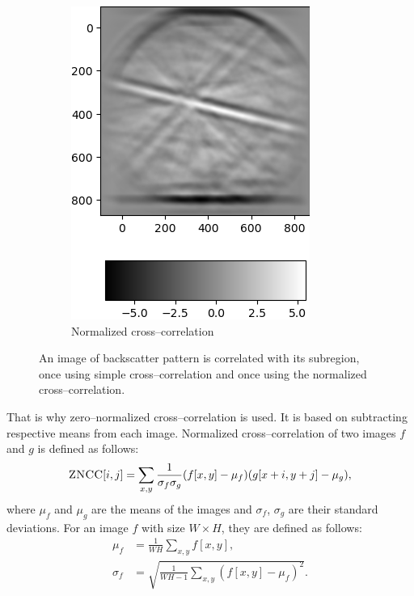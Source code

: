 \begin{figure}
\begin{subfigure}{.49\textwidth}
		\includegraphics[width=\linewidth]{img/normalized_corr}
		\caption{Normalized cross--correlation}
		\label{normalized-cross}
	\end{subfigure}
	
	\caption{An image of backscatter pattern is correlated with its subregion, once using simple cross--correlation and once using the normalized cross--correlation.}
\end{figure}

That is why zero--normalized cross--correlation is used. It is based on subtracting respective means from each image. Normalized cross--correlation of two images $f$ and $g$ is defined as follows:
\[
\textsc{ZNCC}[i,j] = \sum_{x, y} \frac{1}{\sigma_f \sigma_g}(f[x,y] - \mu_f)(g[x+i,y+j] - \mu_g),
\]  
where $\mu_f$ and $\mu_g$ are the means of the images and $\sigma_f$, $\sigma_g$ are their standard deviations. For an image $f$ with size $W \times H$, they are defined as follows:
\begin{align*}
\mu_f &= \frac{1}{WH} \sum_{x,y}{}f[x,y], \\
\sigma_f &= \sqrt{\frac{1}{WH-1} \sum_{x,y}(f[x,y]-\mu_f)^2}.
\end{align*}

